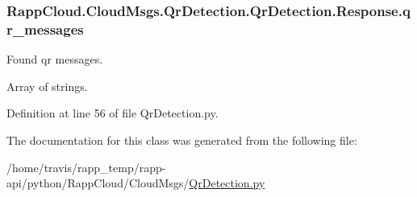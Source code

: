 \hypertarget{classRappCloud_1_1CloudMsgs_1_1QrDetection_1_1QrDetection_1_1Response_a651d1c714f77200d64119da613dea096}{
\subsubsection[{qr\-\_\-messages}]{\setlength{\rightskip}{0pt plus 5cm}Rapp\-Cloud.\-Cloud\-Msgs.\-Qr\-Detection.\-Qr\-Detection.\-Response.\-qr\-\_\-messages}}\label{classRappCloud_1_1CloudMsgs_1_1QrDetection_1_1QrDetection_1_1Response_a651d1c714f77200d64119da613dea096}


Found qr messages. 

Array of strings. 

Definition at line 56 of file Qr\-Detection.\-py.



The documentation for this class was generated from the following file\-:\begin{DoxyCompactItemize}
\item 
/home/travis/rapp\-\_\-temp/rapp-\/api/python/\-Rapp\-Cloud/\-Cloud\-Msgs/\hyperlink{QrDetection_8py}{Qr\-Detection.\-py}\end{DoxyCompactItemize}
